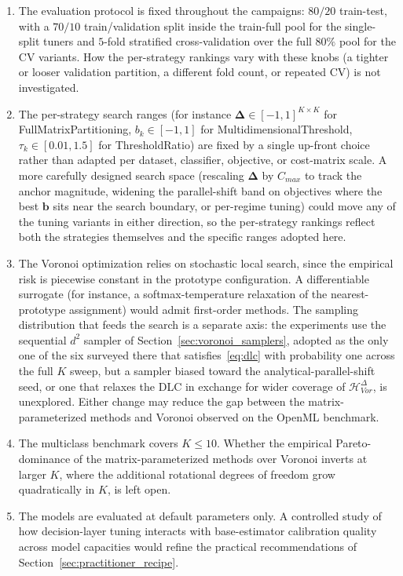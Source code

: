 \begin{enumerate}
    \item The evaluation protocol is fixed throughout the campaigns: $80/20$ train-test, with a $70/10$ train/validation split inside the train-full pool for the single-split tuners and $5$-fold stratified cross-validation over the full $80\%$ pool for the CV variants. How the per-strategy rankings vary with these knobs (a tighter or looser validation partition, a different fold count, or repeated CV) is not investigated.
    \item The per-strategy search ranges (for instance $\boldsymbol{\Delta} \in [-1, 1]^{K \times K}$ for FullMatrixPartitioning, $b_k \in [-1, 1]$ for MultidimensionalThreshold, $\tau_k \in [0.01, 1.5]$ for ThresholdRatio) are fixed by a single up-front choice rather than adapted per dataset, classifier, objective, or cost-matrix scale. A more carefully designed search space (rescaling $\boldsymbol{\Delta}$ by $C_{max}$ to track the anchor magnitude, widening the parallel-shift band on objectives where the best $\mathbf{b}$ sits near the search boundary, or per-regime tuning) could move any of the tuning variants in either direction, so the per-strategy rankings reflect both the strategies themselves and the specific ranges adopted here.
    \item The Voronoi optimization relies on stochastic local search, since the empirical risk is piecewise constant in the prototype configuration. A differentiable surrogate (for instance, a softmax-temperature relaxation of the nearest-prototype assignment) would admit first-order methods. The sampling distribution that feeds the search is a separate axis: the experiments use the sequential $d^2$ sampler of Section~\ref{sec:voronoi_samplers}, adopted as the only one of the six surveyed there that satisfies~\eqref{eq:dlc} with probability one across the full $K$ sweep, but a sampler biased toward the analytical-parallel-shift seed, or one that relaxes the DLC in exchange for wider coverage of $\mathcal{H}_{Vor}^{\Delta}$, is unexplored. Either change may reduce the gap between the matrix-parameterized methods and Voronoi observed on the OpenML benchmark.
    \item The multiclass benchmark covers $K \leq 10$. Whether the empirical Pareto-dominance of the matrix-parameterized methods over Voronoi inverts at larger $K$, where the additional rotational degrees of freedom grow quadratically in $K$, is left open.
    \item The models are evaluated at default parameters only. A controlled study of how decision-layer tuning interacts with base-estimator calibration quality across model capacities would refine the practical recommendations of Section~\ref{sec:practitioner_recipe}.

\end{enumerate}
